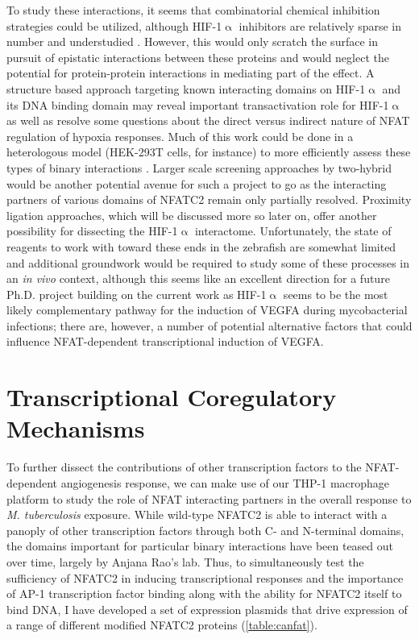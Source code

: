 To study these interactions, it seems that combinatorial chemical inhibition strategies could be utilized, although HIF\hyp{}1$\upalpha$ inhibitors are relatively sparse in number and understudied \citep{Viziteu2016}. However, this would only scratch the surface in pursuit of epistatic interactions between these proteins and would neglect the potential for protein\hyp{}protein interactions in mediating part of the effect. A structure based approach targeting known interacting domains on HIF\hyp{}1$\upalpha$ and its DNA binding domain may reveal important transactivation role for HIF\hyp{}1$\upalpha$ as well as resolve some questions about the direct versus indirect nature of NFAT regulation of hypoxia responses. Much of this work could be done in a heterologous model (HEK\hyp{}293T cells, for instance) to more efficiently assess these types of binary interactions \citep{Graham1977}. Larger scale screening approaches by two\hyp{}hybrid would be another potential avenue for such a project to go as the interacting partners of various domains of NFATC2 remain only partially resolved. Proximity ligation approaches, which will be discussed more so later on, offer another possibility for dissecting the HIF\hyp{}1$\upalpha$ interactome. Unfortunately, the state of reagents to work with toward these ends in the zebrafish are somewhat limited and additional groundwork would be required to study some of these processes in an \textit{in vivo} context, although this seems like an excellent direction for a future Ph.D. project building on the current work as HIF\hyp{}1$\upalpha$ seems to be the most likely complementary pathway for the induction of VEGFA during mycobacterial infections; there are, however, a number of potential alternative factors that could influence NFAT\hyp{}dependent transcriptional induction of VEGFA.

\section{Transcriptional Coregulatory Mechanisms}\label{nfatpartners}

To further dissect the contributions of other transcription factors to the NFAT\hyp{}dependent angiogenesis response, we can make use of our THP\hyp{}1 macrophage platform to study the role of NFAT interacting partners in the overall response to \textit{M. tuberculosis} exposure. While wild\hyp{}type NFATC2 is able to interact with a panoply of other transcription factors through both C\hyp{} and N\hyp{}terminal domains, the domains important for particular binary interactions have been teased out over time, largely by Anjana Rao's lab. Thus, to simultaneously test the sufficiency of NFATC2 in inducing transcriptional responses and the importance of AP\hyp{}1 transcription factor binding along with the ability for NFATC2 itself to bind DNA, I have developed a set of expression plasmids that drive expression of a range of different modified NFATC2 proteins (\autoref{table:canfat}).

